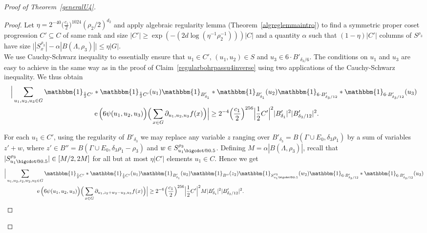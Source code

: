 \documentclass[a4paper,11pt]{article}
\makeatletter
\numberwithin{theorem}{section}
\theoremstyle{definition}
\newcommand\id{\mathbbm{1}}
\newcommand{\on}[1]{
	\operatorname{#1}
}
\newcommand*\bcdot{\mathpalette\bigcdot@{0.5}}
\newcommand*\bigcdot@[2]{\mathbin{\vcenter{\hbox{\scalebox{#2}{$\m@th#1\bullet$}}}}}
\makeatother
\begin{document}
\begin{proof}[Proof of Theorem~\ref{generalU4}]
    \begin{proof} 
    Let $\eta = 2^{-40}\Big(\frac{c_1}{2}\Big)^{1024}(\rho_2/2)^{d_2}$ and apply algebraic regularity lemma (Theorem~\ref{algreglemmaintro}) to find a symmetric proper coset progression $C' \subseteq C$ of same rank and size $|C'| \geq \exp(-(2d\log(\eta^{-1}\rho_2^{-1}))) |C|$ and a quantity $\alpha$ such that $(1-\eta)|C'|$ columns of $S^{\rho_3}$ have size $\Big||S^{\rho_3}_x| - \alpha |B(\Lambda, \rho_3)|\Big| \leq \eta |G|$.\\
    
    We use Cauchy-Schwarz inequality to essentially ensure that $u_1 \in C'$, $(u_1, u_2) \in S$ and $u_3 \in 6 \cdot B'_{\delta_3/6}$. The conditions on $u_1$ and $u_3$ are easy to achieve in the same way as in the proof of Claim~\ref{regularbohrpassu4inverse} using two applications of the Cauchy-Schwarz inequality. We thus obtain
    \begin{align*}\Big|\sum_{u_1, u_2, u_3 \in G} \id_{\frac{1}{2}C'} &\ast \id_{\frac{1}{2}C'}(u_1)\id_{B'_{\delta_1}} \ast \id_{B'_{\delta_1}} (u_2)\id_{6 \cdot B'_{\delta_3/{12}}} \ast \id_{6 \cdot B'_{\delta_3/12}}(u_3)\\
        &\on{e}\Big(6\psi(u_1, u_2, u_3)\Big) \Big(\sum_{x \in G} \partial_{u_1, u_2, u_3} f(x)\Big) \Big| \geq 2^{-4}\Big(\frac{c_1}{2}\Big)^{256}  \Big|\frac{1}{2}C'\Big|^2 |B'_{\delta_1}|^2  |B'_{\delta_3/12}|^2.
        \end{align*}

    For each $u_1 \in C'$, using the regularity of $B'_{\delta_3}$ we may replace any variable $z$ ranging over $B'_{\delta_3} = B(\Gamma \cup E_0, \delta_3\rho_1)$ by a sum of variables $z' + w$, where $z' \in B'' = B(\Gamma \cup E_0, \delta_3\rho_1 - \rho_3)$ and $w \in S^{\rho_3}_{u_1 \bcdot}$. Defining $M = \alpha |B(\Lambda, \rho_3)|$, recall that $|S^{\rho_3}_{u_1 \bcdot}| \in [M/2, 2M]$ for all but at most $\eta|C'|$ elements $u_1 \in C$. Hence we get
    \begin{align*}&\Big|\sum_{u_1, u_2, z_2, w_2,  u_3 \in G} \id_{\frac{1}{2}C'} \ast \id_{\frac{1}{2}C'}(u_1)
    \id_{B'_{\delta_1}}(u_2)\id_{B''}(z_2) \id_{S^{\rho_3}_{u_1 \bcdot}}(w_2)
    \id_{6 \cdot B'_{\delta_3/{12}}} \ast \id_{6 \cdot B'_{\delta_3/12}}(u_3)\\
        &\hspace{2cm}\on{e}\Big(6\psi(u_1, u_2, u_3)\Big) \Big(\sum_{x \in G} \partial_{u_1, z_2 + w_2 - u_2, u_3} f(x)\Big) \Big| \geq 2^{-6}\Big(\frac{c_1}{2}\Big)^{256}  \Big|\frac{1}{2}C'\Big|^2 M |B'_{\delta_1}|^2  |B'_{\delta_3/12}|^2.
        \end{align*}


\end{proof}
\end{proof}
\end{document}
